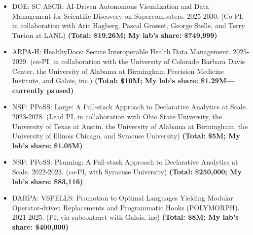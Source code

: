 \documentclass[line]{res}
\begin{document}
\begin{resume}
\begin{itemize}
  \item
    DOE: SC ASCR: AI-Driven Autonomous Visualization and Data Management for Scientific Discovery on Supercomputers. 2025-2030. (Co-PI, in collaboration with Aric Hagberg, Pascal Grosset, George Stelle, and Terry Turton at LANL) \textbf{(Total: \$19.26M; My lab's share: \$749,999)}
  \item
    ARPA-H: HealthyDocs: Secure Interoperable Health Data Management. 2025-2029. (co-PI, in collaboration with
    the University of Colorado Barbara Davis Center, the University of Alabama at Birmingham Precision Medicine Institute, and Galois, inc.) \textbf{(Total: \$10M; My lab's share: \$1.29M---currently paused)} 
  \item
    NSF: PPoSS: Large: A Full-stack Approach to Declarative Analytics at Scale. 2023-2028. (Lead PI, in collaboration with
    Ohio State University, the University of Texas at Austin, the University of Alabama at Birmingham, the University of Illinois Chicago, and Syracuse University) \textbf{(Total: \$5M; My lab's share: \$1.05M)} 
  \item
  NSF: PPoSS: Planning: A Full-stack Approach to Declarative Analytics at Scale. 2022-2023. (co-PI, with Syracuse University) \textbf{(Total: \$250,000; My lab's share: \$83,116)} 
  \item
  DARPA: VSPELLS: Promotion to Optimal Languages Yielding Modular Operator-driven Replacements and Programmatic Hooks (POLYMORPH). 2021-2025. (PI, via subcontract with Galois, inc) \textbf{(Total: \$8M; My lab's share: \$400,000)}
\end{itemize}




\end{resume}
\end{document}
